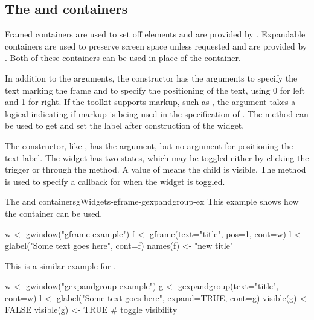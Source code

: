 \subsection{The  and  containers}
\label{sec:gWidgets-decorated-cont}

Framed containers are used to set off elements and are provided by
. Expandable containers are used to preserve
screen space unless requested and are provided by
. Both of these containers can be used in
place of the  container.

In addition to the  arguments, the 
constructor has the arguments  to specify the
text marking the frame and  to specify the
positioning of the text, using 0 for left and 1 for right. If the
toolkit supports markup, such as , the
 argument takes a logical indicating if
markup is being used in the specification of .  The
 method can be used to get and set the label
after construction of the widget.


The  constructor, like , has
the  argument, but no  argument for positioning
the text label. The widget has two states, which may be toggled either
by clicking the trigger or through the
 method.  A value of 
means the child is visible. The
 method is used to specify a
callback for when the widget is toggled.

\begin{example}{The  and  containers}{gWidgets-gframe-gexpandgroup-ex}
This example shows how the  container can be used.
\begin{Schunk}
\begin{Sinput}
 w <- gwindow("gframe example")
 f <- gframe(text="title", pos=1, cont=w)
 l <- glabel("Some text goes here", cont=f)
 names(f) <- "new title"
\end{Sinput}
\end{Schunk}

This is a similar example for .
\begin{Schunk}
\begin{Sinput}
 w <- gwindow("gexpandgroup example")
 g <- gexpandgroup(text="title", cont=w)
 l <- glabel("Some text goes here", expand=TRUE, cont=g)
 visible(g) <- FALSE
 visible(g) <- TRUE                      # toggle visibility
\end{Sinput}
\end{Schunk}
\end{example}




